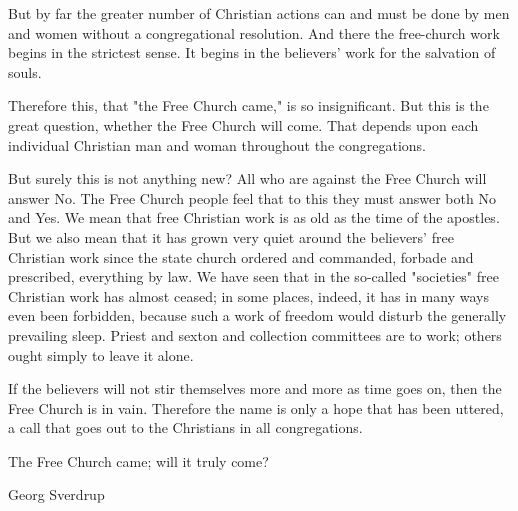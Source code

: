 But by far the greater number of Christian actions can and must be done by men and women without a congregational resolution. And there the free-church work begins in the strictest sense. It begins in the believers’ work for the salvation of souls.

Therefore this, that "the Free Church came," is so insignificant. But this is the great question, whether the Free Church will come. That depends upon each individual Christian man and woman throughout the congregations.

But surely this is not anything new? All who are against the Free Church will answer No. The Free Church people feel that to this they must answer both No and Yes. We mean that free Christian work is as old as the time of the apostles. But we also mean that it has grown very quiet around the believers’ free Christian work since the state church ordered and commanded, forbade and prescribed, everything by law. We have seen that in the so-called "societies" free Christian work has almost ceased; in some places, indeed, it has in many ways even been forbidden, because such a work of freedom would disturb the generally prevailing sleep. Priest and sexton and collection committees are to work; others ought simply to leave it alone.

If the believers will not stir themselves more and more as time goes on, then the Free Church is in vain. Therefore the name is only a hope that has been uttered, a call that goes out to the Christians in all congregations.

The Free Church came; will it truly come?

Georg Sverdrup
